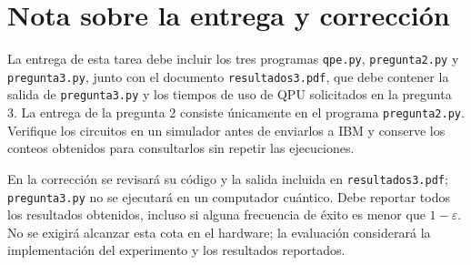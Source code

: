 \documentclass[10pt]{article}
\begin{document}
\section*{Nota sobre la entrega y corrección}

La entrega de esta tarea debe incluir los tres programas \texttt{qpe.py},
\texttt{pregunta2.py} y \texttt{pregunta3.py}, junto con el documento
\texttt{resultados3.pdf}, que debe contener la salida de \texttt{pregunta3.py} y
los tiempos de uso de QPU solicitados en la pregunta 3.
La entrega de la pregunta 2 consiste únicamente en
el programa \texttt{pregunta2.py}. Verifique los circuitos en un
simulador antes de enviarlos a IBM y conserve los conteos obtenidos para consultarlos
sin repetir las ejecuciones.

En la corrección se revisará su código y la salida incluida en \texttt{resultados3.pdf};
\texttt{pregunta3.py} no se ejecutará en un computador cuántico. Debe reportar todos
los resultados obtenidos, incluso si alguna frecuencia de éxito es menor que
$1-\varepsilon$. No se exigirá alcanzar esta
cota en el hardware; la evaluación considerará la implementación del experimento
y los resultados reportados.
\end{document}
